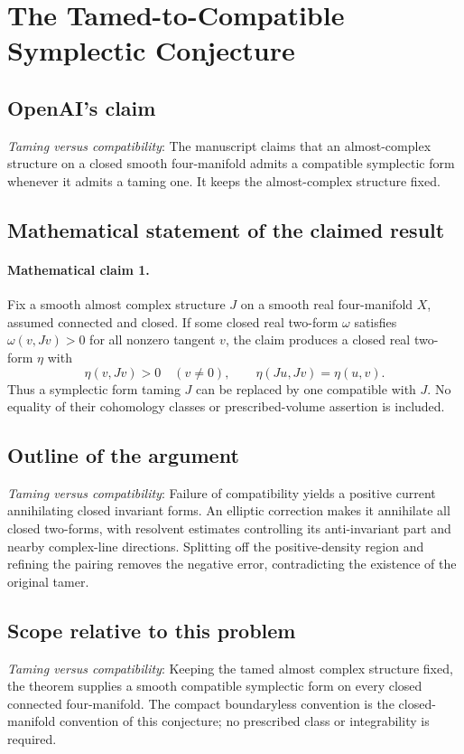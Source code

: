 \documentclass[11pt]{article}
\begin{document}
\section*{The Tamed-to-Compatible Symplectic Conjecture}

\subsection{OpenAI's claim}
\textit{Taming versus compatibility}: The manuscript claims that an almost-complex structure on a closed smooth four-manifold admits a compatible symplectic form whenever it admits a taming one. It keeps the almost-complex structure fixed.

\subsection{Mathematical statement of the claimed result}
\paragraph{Mathematical claim 1.} Fix a smooth almost complex structure $J$ on a smooth real four-manifold $X$, assumed connected and closed. If some closed real two-form $\omega$ satisfies $\omega(v,Jv)>0$ for all nonzero tangent $v$, the claim produces a closed real two-form $\eta$ with \[\eta(v,Jv)>0\quad(v\ne0),\qquad\eta(Ju,Jv)=\eta(u,v).\] Thus a symplectic form taming $J$ can be replaced by one compatible with $J$. No equality of their cohomology classes or prescribed-volume assertion is included.

\subsection{Outline of the argument}
\textit{Taming versus compatibility}: Failure of compatibility yields a positive current annihilating closed invariant forms. An elliptic correction makes it annihilate all closed two-forms, with resolvent estimates controlling its anti-invariant part and nearby complex-line directions. Splitting off the positive-density region and refining the pairing removes the negative error, contradicting the existence of the original tamer.

\subsection{Scope relative to this problem}
\textit{Taming versus compatibility}: Keeping the tamed almost complex structure fixed, the theorem supplies a smooth compatible symplectic form on every closed connected four-manifold. The compact boundaryless convention is the closed-manifold convention of this conjecture; no prescribed class or integrability is required.
\end{document}
